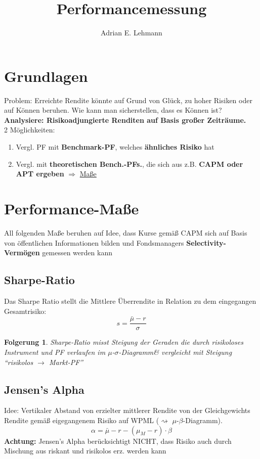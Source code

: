 \documentclass[a4paper]{article}
\title{Performancemessung}
\author{Adrian E. Lehmann}
\theoremstyle{break}
\newcommand{\ms}{$\mu$-$\sigma$}
\newcommand{\msd}{\ms-Diagramm}
\newcommand{\mbd}{$\mu$-$\beta$-Diagramm}
\newtheorem{der}{Folgerung}[section]
\begin{document}
        \maketitle
        \tableofcontents
        \newpage
        
\section{Grundlagen}
    Problem: Erreichte Rendite könnte auf Grund von Glück, zu hoher Risiken oder auf Können beruhen. Wie kann man sicherstellen, dass es Können ist?
    \textbf{Analysiere: Risikoadjungierte Renditen auf Basis großer Zeiträume.}\\

2 Möglichkeiten:\\
\begin{enumerate}
    \item Vergl. PF mit \textbf{Benchmark-PF}, welches \textbf{ähnliches Risiko} hat
    \item Vergl. mit \textbf{theoretischen Bench.-PFs.}, die sich aus z.B. \textbf{CAPM oder APT ergeben} $\Rightarrow$ \hyperref[perf]{Maße}
\end{enumerate}

\section{Performance-Maße}
\label{perf}
    All folgenden Maße beruhen auf Idee, dass Kurse gemäß CAPM sich auf Basis von öffentlichen Informationen bilden und Fondsmanagers \textbf{Selectivity-Vermögen} gemessen werden kann
\subsection{Sharpe-Ratio}
    Das Sharpe Ratio stellt die Mittlere Überrendite in Relation zu dem eingegangen Gesamtrisiko:
    $$s = \frac{\bar{\mu} - r}{\sigma}$$
    \begin{der}
        Sharpe-Ratio misst Steigung der Geraden die durch risikoloses Instrument und PF verlaufen im \msd \& vergleicht mit Steigung ``risikolos $\rightarrow$ Markt-PF''
    \end{der}
\subsection{Jensen's Alpha}
    Idee: Vertikaler Abstand von erzielter mittlerer Rendite von der Gleichgewichts Rendite gemäß eigegangenem Risiko auf WPML ($\rightsquigarrow$ \mbd).
    $$\alpha = \bar{\mu} - r - (\mu_M - r)  \cdot \beta$$ 
    \textbf{Achtung:} Jensen's Alpha berücksichtigt NICHT, dass Risiko auch durch Mischung aus riskant und risikolos erz. werden kann
\end{document}

